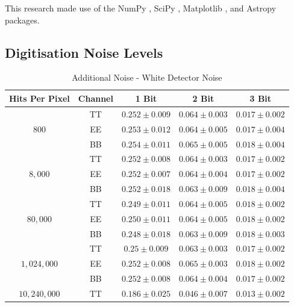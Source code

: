 \documentclass[apj]{emulateapj}
\begin{document}
This research made use of the NumPy \citep{numpy}, SciPy \citep{scipy}, Matplotlib \citep{matplotlib}, and Astropy \citep{astropy} packages.

\newpage

\appendix

\subsection{Digitisation Noise Levels}
\label{subsec:appendixnoisetables}

\def\arraystretch{1.3}
\begin{table}[tbh]
\begin{center}
\caption{\label{tab:extranoisewhite} Additional Noise - White Detector Noise}
\small
\begin{tabular}{c c c c c}
Hits Per Pixel & Channel & 1 Bit & 2 Bit & 3 Bit \\
\hline
\hline
\multirow{3}{*}{$800$}  & TT  & $ 0.252 \pm 0.009 $  & $ 0.064 \pm 0.003 $  & $ 0.017 \pm 0.002 $ \\
& EE  & $ 0.253 \pm 0.012 $  & $ 0.064 \pm 0.005 $  & $ 0.017 \pm 0.004 $ \\
& BB  & $ 0.254 \pm 0.011 $  & $ 0.065 \pm 0.005 $  & $ 0.018 \pm 0.004 $ \\
\hline
\multirow{3}{*}{$8,000$}  & TT  & $ 0.252 \pm 0.008 $  & $ 0.064 \pm 0.003 $  & $ 0.017 \pm 0.002 $ \\
& EE  & $ 0.252 \pm 0.007 $  & $ 0.064 \pm 0.004 $  & $ 0.017 \pm 0.002 $ \\
& BB  & $ 0.252 \pm 0.018 $  & $ 0.063 \pm 0.009 $  & $ 0.018 \pm 0.004 $ \\
\hline
\multirow{3}{*}{$80,000$}  & TT  & $ 0.249 \pm 0.011 $  & $ 0.064 \pm 0.005 $  & $ 0.018 \pm 0.002 $ \\
& EE  & $ 0.250 \pm 0.011 $  & $ 0.064 \pm 0.005 $  & $ 0.018 \pm 0.002 $ \\
& BB  & $ 0.248 \pm 0.018 $  & $ 0.063 \pm 0.009 $  & $ 0.018 \pm 0.003 $ \\
\hline
\multirow{3}{*}{$1,024,000$}  & TT  & $ 0.25 \pm 0.009 $  & $ 0.063 \pm 0.003 $  & $ 0.017 \pm 0.002 $ \\
& EE  & $ 0.252 \pm 0.008 $  & $ 0.065 \pm 0.003 $  & $ 0.018 \pm 0.002 $ \\
& BB  & $ 0.252 \pm 0.008 $  & $ 0.064 \pm 0.004 $  & $ 0.017 \pm 0.002 $ \\
\hline
\multirow{3}{*}{$10,240,000$}  & TT  & $ 0.186 \pm 0.025 $  & $ 0.046 \pm 0.007 $  & $ 0.013 \pm 0.002 $ \\

\end{tabular}
\end{center}
\end{table}
\end{document}
